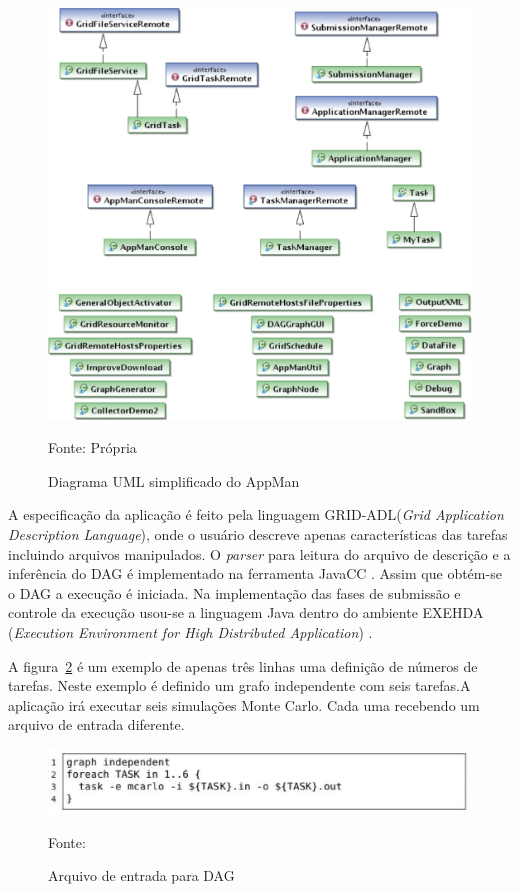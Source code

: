 \begin{figure}[htb]
\begin{center}
\includegraphics[scale=0.6]{./img/UML-2.eps}
\caption{Diagrama UML simplificado do AppMan}
\label{fig:AppMan-UML}
Fonte: Própria
\end{center}
\end{figure}

A especificação da aplicação é feito pela linguagem GRID-ADL(\emph{Grid Application Description Language}), onde o usuário descreve apenas características das tarefas incluindo arquivos manipulados. O \emph{parser} para leitura do arquivo de descrição e a inferência do DAG é implementado na ferramenta JavaCC \cite{javacc}. Assim que obtém-se o DAG a execução é iniciada. Na implementação das fases de submissão e controle da execução usou-se a linguagem Java dentro do ambiente EXEHDA (\emph{Execution Environment for High Distributed Application}) \cite{exehda}.

A figura~\ref{fig:Arquivo_DAG} é um exemplo de apenas três linhas uma definição de números de tarefas. Neste exemplo é definido um grafo independente com seis tarefas.A aplicação irá executar seis simulações Monte Carlo. Cada uma recebendo um arquivo de entrada diferente.

\begin{figure}[htb]
\begin{center}
\includegraphics[scale=0.7]{./img/grid-adl.eps}
\caption{Arquivo de entrada para DAG}
\label{fig:Arquivo_DAG}
Fonte: \cite{Mangan2006}
\end{center}
\end{figure}


